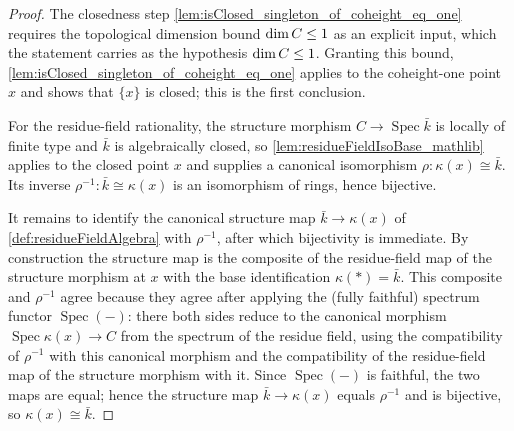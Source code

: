 \begin{proof}
        \leanok
  The closedness step \cref{lem:isClosed_singleton_of_coheight_eq_one} requires
  the topological dimension bound $\dim C \le 1$ as an explicit input,
  which the statement carries as the hypothesis $\dim C \le 1$.
  Granting this bound, \cref{lem:isClosed_singleton_of_coheight_eq_one} applies to
  the coheight-one point $x$ and shows that $\{x\}$ is closed; this is the first
  conclusion.

  For the residue-field rationality, the structure morphism $C \to
  \operatorname{Spec}\bar k$ is locally of finite type and $\bar k$ is
  algebraically closed, so \cref{lem:residueFieldIsoBase_mathlib} applies to the
  closed point $x$ and supplies a canonical isomorphism
  $\rho \colon \kappa(x) \cong \bar k$.  Its inverse
  $\rho^{-1} \colon \bar k \cong \kappa(x)$ is an isomorphism of rings, hence
  bijective.

  It remains to identify the canonical structure map $\bar k \to \kappa(x)$ of
  \cref{def:residueFieldAlgebra} with $\rho^{-1}$, after which bijectivity is
  immediate.  By construction the structure map is the composite of the
  residue-field map of the structure morphism at $x$ with the base identification
  $\kappa(\ast) = \bar k$.  This composite and $\rho^{-1}$ agree because they agree
  after applying the (fully faithful) spectrum functor $\operatorname{Spec}(-)$:
  there both sides reduce to the canonical morphism
  $\operatorname{Spec}\kappa(x) \to C$ from the spectrum of the residue field,
  using the compatibility of $\rho^{-1}$ with this canonical morphism and the
  compatibility of the residue-field map of the structure morphism with it.  Since
  $\operatorname{Spec}(-)$ is faithful, the two maps are equal; hence the structure
  map $\bar k \to \kappa(x)$ equals $\rho^{-1}$ and is bijective, so
  $\kappa(x) \cong \bar k$.
\end{proof}
